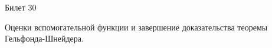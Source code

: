 \documentclass[a4paper,12pt]{article}
\begin{document}
\newpage
\begin{mybox2}{\hypertarget{bil30}{Билет 30}}

\begin{formbox}{}
Оценки вспомогательной функции и завершение доказательства теоремы Гельфонда-Шнейдера.
\end{formbox}

\end{mybox2}




















\newpage
\end{document}

